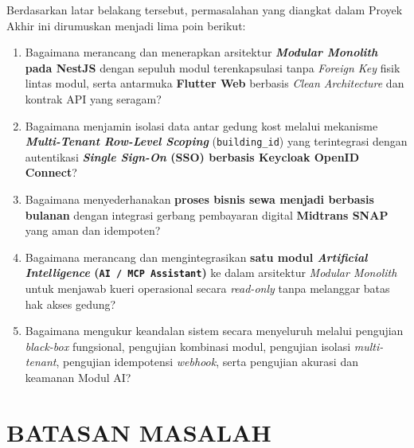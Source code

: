 Berdasarkan latar belakang tersebut, permasalahan yang diangkat dalam Proyek Akhir ini dirumuskan menjadi lima poin berikut:
\begin{enumerate}[label=\arabic*., leftmargin=*]
  \item Bagaimana merancang dan menerapkan arsitektur \textbf{\textit{Modular Monolith} pada NestJS} dengan sepuluh modul terenkapsulasi tanpa \textit{Foreign Key} fisik lintas modul, serta antarmuka \textbf{Flutter Web} berbasis \textit{Clean Architecture} dan kontrak API yang seragam?
  \item Bagaimana menjamin isolasi data antar gedung kost melalui mekanisme \textbf{\textit{Multi-Tenant Row-Level Scoping}} (\texttt{building\_id}) yang terintegrasi dengan autentikasi \textbf{\textit{Single Sign-On} (SSO) berbasis Keycloak OpenID Connect}?
  \item Bagaimana menyederhanakan \textbf{proses bisnis sewa menjadi berbasis bulanan} dengan integrasi gerbang pembayaran digital \textbf{Midtrans SNAP} yang aman dan idempoten?
  \item Bagaimana merancang dan mengintegrasikan \textbf{satu modul \textit{Artificial Intelligence} (\texttt{AI / MCP Assistant})} ke dalam arsitektur \textit{Modular Monolith} untuk menjawab kueri operasional secara \textit{read-only} tanpa melanggar batas hak akses gedung?
  \item Bagaimana mengukur keandalan sistem secara menyeluruh melalui pengujian \textit{black-box} fungsional, pengujian kombinasi modul, pengujian isolasi \textit{multi-tenant}, pengujian idempotensi \textit{webhook}, serta pengujian akurasi dan keamanan Modul AI?
\end{enumerate}

\ifbukupa
\section{BATASAN MASALAH}

